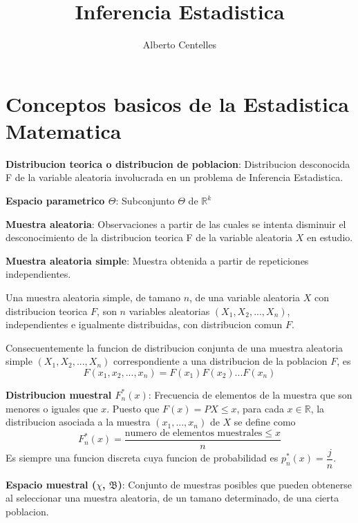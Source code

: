 \documentclass[10pt]{extarticle}
\title{Inferencia Estadistica}
\author{Alberto Centelles}
\date{}
\newcommand{\R}{\mathbb{R}}
\newcommand{\<}{\langle}
\renewcommand{\>}{\rangle}
\theoremstyle{definition}
\begin{document}
\newtheorem{lemma}{Lema}
\newtheorem*{lemma*}{Lema}
\newtheorem*{theorem*}{Teorema}

\maketitle

\section{Conceptos basicos de la Estadistica Matematica}

\textbf{Distribucion teorica o distribucion de poblacion}: Distribucion desconocida F de la variable aleatoria involucrada en un problema de Inferencia Estadistica.

\textbf{Espacio parametrico $\Theta$}: Subconjunto $\Theta$ de $\R^k$

\textbf{Muestra aleatoria}: Observaciones a partir de las cuales se intenta disminuir el desconocimiento de la distribucion teorica F de la variable aleatoria $X$ en estudio.

\textbf{Muestra aleatoria simple}: Muestra obtenida a partir de repeticiones independientes.

Una muestra aleatoria simple, de tamano $n$, de una variable aleatoria $X$ con distribucion teorica $F$, son $n$ variables aleatorias $(X_1, X_2,...,X_n)$, independientes e igualmente distribuidas, con distribucion comun $F$.

Consecuentemente la funcion de distribucion conjunta de una muestra aleatoria simple $(X_1, X_2, ..., X_n)$ correspondiente a una distribucion de la poblacion $F$, es
\begin{equation*}
  F(x_1, x_2,..., x_n)=F(x_1)F(x_2)...F(x_n)
\end{equation*}

\textbf{Distribucion muestral $F_n^*(x)$}: Frecuencia de elementos de la muestra que son menores o iguales que $x$. Puesto que $F(x)=P{X\leq x}$, para cada $x \in \R$, la distribucion asociada a la muestra $(x_1,..., x_n)$ de $X$ se define como
\begin{equation*}
  F_n^*(x)=\dfrac{\text{numero de elementos muestrales} \leq x}{n}
\end{equation*}
Es siempre una funcion discreta cuya funcion de probabilidad es $p_n^*(x)=\dfrac{j}{n}$.

\textbf{Espacio muestral ($\chi$, $\mathfrak{B}$)}: Conjunto de muestras posibles que pueden obtenerse al seleccionar una muestra aleatoria, de un tamano determinado, de una cierta poblacion.
\end{document}
